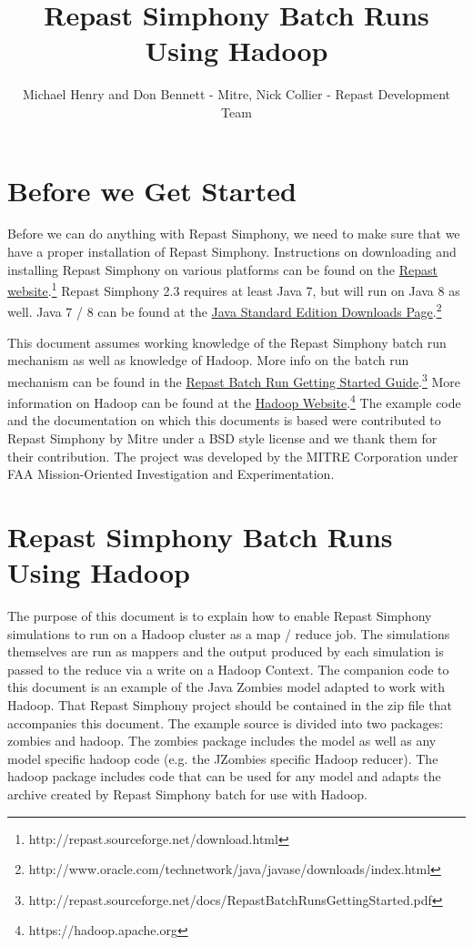 \documentclass[11pt]{amsart}
\title{Repast Simphony Batch Runs Using Hadoop}
\author{Michael Henry and Don Bennett - Mitre, Nick Collier - Repast Development Team}
\begin{document}
 
\maketitle
\setcounter{section}{-1}

\section{Before we Get Started}
Before we can do anything with Repast Simphony, we need to make sure that we have a proper installation of Repast Simphony. Instructions on downloading and installing Repast Simphony on various platforms can be found on the \href{http://repast.sourceforge.net/download.html}{Repast website}.\footnote{http://repast.sourceforge.net/download.html} Repast Simphony 2.3 requires at least Java 7, but will run on Java 8 as well. Java 7 / 8  can be found at the \href{http://www.oracle.com/technetwork/java/javase/downloads/index.html}{Java Standard Edition Downloads Page}.\footnote{http://www.oracle.com/technetwork/java/javase/downloads/index.html} 

This document assumes working knowledge of the Repast Simphony batch run mechanism as well as knowledge of Hadoop. More info on the batch run mechanism can be found in the \href{http://repast.sourceforge.net/docs/RepastBatchRunsGettingStarted.pdf}{Repast Batch Run Getting Started Guide}.\footnote{http://repast.sourceforge.net/docs/RepastBatchRunsGettingStarted.pdf} More information on Hadoop can be found at the \href{https://hadoop.apache.org}{Hadoop Website}.\footnote{https://hadoop.apache.org} The example code and the documentation on which this documents is based were contributed to Repast Simphony by Mitre under a BSD style license and we thank them for their contribution. The project was developed by the MITRE Corporation under FAA Mission-Oriented Investigation and Experimentation.

\section{Repast Simphony Batch Runs Using Hadoop}
The purpose of this document is to explain how to enable Repast Simphony simulations to run on a Hadoop cluster as a map / reduce job. The simulations themselves are run as mappers and the output produced by each simulation is passed to the reduce via a write on a Hadoop Context. The companion code to this document is an example of the Java Zombies model adapted to work with Hadoop. That Repast Simphony project should be contained in the zip file that accompanies this document. The example source is divided into two packages: zombies and hadoop. The zombies package includes the model as well as any model specific hadoop code (e.g. the JZombies specific Hadoop reducer). The hadoop package includes code that can be used for any model and adapts the archive created by Repast Simphony batch for use with Hadoop.
\end{document}

